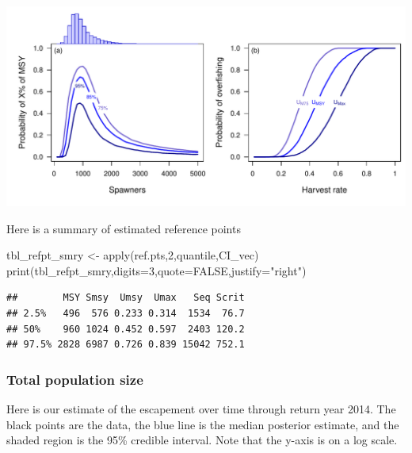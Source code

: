 \documentclass[
  11pt,
]{article}
\newenvironment{Shaded}{}{}
\newcommand{\DataTypeTok}[1]{#1}
\newcommand{\DecValTok}[1]{#1}
\newcommand{\KeywordTok}[1]{\textcolor[rgb]{0.00,0.00,1.00}{#1}}
\newcommand{\NormalTok}[1]{#1}
\newcommand{\OperatorTok}[1]{#1}
\newcommand{\OtherTok}[1]{\textcolor[rgb]{1.00,0.25,0.00}{#1}}
\newcommand{\StringTok}[1]{\textcolor[rgb]{0.00,0.50,0.50}{#1}}
\begin{document}
\begin{Shaded}
\begin{Highlighting}[]
{{     \DataTypeTok{y=}\KeywordTok{par}\NormalTok{()}\OperatorTok{$}\NormalTok{usr[}\DecValTok{4}\NormalTok{]}\OperatorTok{-}\NormalTok{offSet}\OperatorTok{*}\KeywordTok{diff}\NormalTok{(}\KeywordTok{par}\NormalTok{()}\OperatorTok{$}\NormalTok{usr[}\DecValTok{3}\OperatorTok{:}\DecValTok{4}\NormalTok{]),}\StringTok{"(b)"}\NormalTok{)}
\end{Highlighting}
\end{Shaded}

\includegraphics{App_2_Summarize_results_Spring_Chinook_files/figure-latex/plot_ref_pts-1.pdf}

Here is a summary of estimated reference points

\begin{Shaded}
\begin{Highlighting}[]
\NormalTok{tbl_refpt_smry <-}\StringTok{ }\KeywordTok{apply}\NormalTok{(ref.pts,}\DecValTok{2}\NormalTok{,quantile,CI_vec)}
\KeywordTok{print}\NormalTok{(tbl_refpt_smry,}\DataTypeTok{digits=}\DecValTok{3}\NormalTok{,}\DataTypeTok{quote=}\OtherTok{FALSE}\NormalTok{,}\DataTypeTok{justify=}\StringTok{"right"}\NormalTok{)}
\end{Highlighting}
\end{Shaded}

\begin{verbatim}
##        MSY Smsy  Umsy  Umax   Seq Scrit
## 2.5%   496  576 0.233 0.314  1534  76.7
## 50%    960 1024 0.452 0.597  2403 120.2
## 97.5% 2828 6987 0.726 0.839 15042 752.1
\end{verbatim}

\hypertarget{total-population-size}{%
\subsubsection{Total population size}\label{total-population-size}}

Here is our estimate of the escapement over time through return year
2014. The black points are the data, the blue line is the median
posterior estimate, and the shaded region is the 95\% credible interval.
Note that the y-axis is on a log scale.
\end{document}
